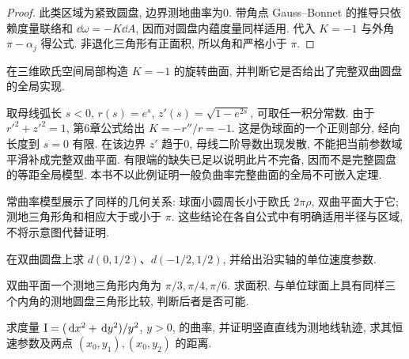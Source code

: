 \begin{proof}
此类区域为紧致圆盘, 边界测地曲率为0. 带角点 Gauss--Bonnet 的推导只依赖度量联络和 $\dd\omega=-K\dd A$, 因而对圆盘内蕴度量同样适用. 代入 $K=-1$ 与外角 $\pi-\alpha_j$ 得公式. 非退化三角形有正面积, 所以角和严格小于 $\pi$.
\end{proof}
\begin{example}
在三维欧氏空间局部构造 $K=-1$ 的旋转曲面, 并判断它是否给出了完整双曲圆盘的全局实现.
\end{example}
\begin{solution}
取母线弧长 $s<0$, $r(s)=e^s$, $z'(s)=\sqrt{1-e^{2s}}$, 可取任一积分常数. 由于 $r'^2+z'^2=1$, 第6章公式给出 $K=-r''/r=-1$. 这是伪球面的一个正则部分, 经向长度到 $s=0$ 有限. 在该边界 $z'$ 趋于0, 母线二阶导数出现发散, 不能把当前参数域平滑补成完整双曲平面. 有限端的缺失已足以说明此片不完备, 因而不是完整圆盘的等距全局模型. 本书不以此例证明一般负曲率完整曲面的全局不可嵌入定理.
\end{solution}
常曲率模型展示了同样的几何关系: 球面小圆周长小于欧氏 $2\pi\rho$, 双曲平面大于它; 测地三角形角和相应大于或小于 $\pi$. 这些结论在各自公式中有明确适用半径与区域, 不将示意图代替证明.
\begin{exercise}\label{ex:12a}
在双曲圆盘上求 $d(0,1/2)$、$d(-1/2,1/2)$, 并给出沿实轴的单位速度参数.
\end{exercise}
\begin{exercise}\label{ex:12b}
双曲平面一个测地三角形内角为 $\pi/3,\pi/4,\pi/6$. 求面积. 与单位球面上具有同样三个内角的测地圆盘三角形比较, 判断后者是否可能.
\end{exercise}
\begin{exercise}\label{ex:12c}
求度量 $\mathrm{I}=(\,\mathrm d x^2+\,\mathrm d y^2)/y^2$, $y>0$, 的曲率, 并证明竖直直线为测地线轨迹, 求其恒速参数及两点 $(x_0,y_1),(x_0,y_2)$ 的距离.
\end{exercise}
